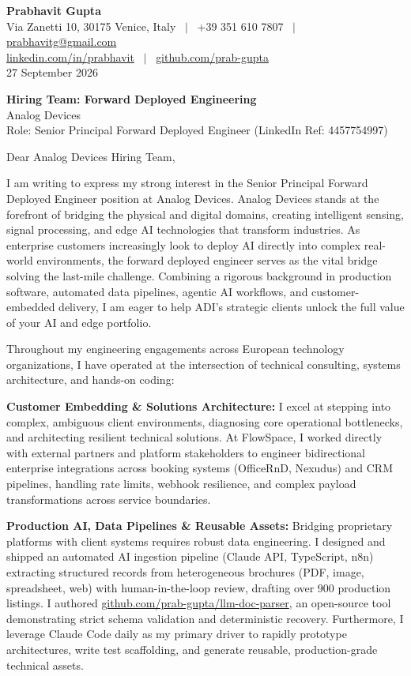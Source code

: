 \documentclass[10.5pt,a4paper]{article}
\begin{document}
\textbf{\large Prabhavit Gupta}\\
Via Zanetti 10, 30175 Venice, Italy ~$\vert$~ +39 351 610 7807 ~$\vert$~ \href{mailto:prabhavitg@gmail.com}{prabhavitg@gmail.com}\\
\href{https://www.linkedin.com/in/prabhavit/}{linkedin.com/in/prabhavit} ~$\vert$~ \href{https://github.com/prab-gupta}{github.com/prab-gupta}\\
27 September 2026

\textbf{Hiring Team: Forward Deployed Engineering}\\
Analog Devices\\
Role: Senior Principal Forward Deployed Engineer (LinkedIn Ref: 4457754997)

Dear Analog Devices Hiring Team,

I am writing to express my strong interest in the Senior Principal Forward Deployed Engineer position at Analog Devices. Analog Devices stands at the forefront of bridging the physical and digital domains, creating intelligent sensing, signal processing, and edge AI technologies that transform industries. As enterprise customers increasingly look to deploy AI directly into complex real-world environments, the forward deployed engineer serves as the vital bridge solving the last-mile challenge. Combining a rigorous background in production software, automated data pipelines, agentic AI workflows, and customer-embedded delivery, I am eager to help ADI's strategic clients unlock the full value of your AI and edge portfolio.

Throughout my engineering engagements across European technology organizations, I have operated at the intersection of technical consulting, systems architecture, and hands-on coding:

\textbf{Customer Embedding \& Solutions Architecture:} I excel at stepping into complex, ambiguous client environments, diagnosing core operational bottlenecks, and architecting resilient technical solutions. At FlowSpace, I worked directly with external partners and platform stakeholders to engineer bidirectional enterprise integrations across booking systems (OfficeRnD, Nexudus) and CRM pipelines, handling rate limits, webhook resilience, and complex payload transformations across service boundaries.

\textbf{Production AI, Data Pipelines \& Reusable Assets:} Bridging proprietary platforms with client systems requires robust data engineering. I designed and shipped an automated AI ingestion pipeline (Claude API, TypeScript, n8n) extracting structured records from heterogeneous brochures (PDF, image, spreadsheet, web) with human-in-the-loop review, drafting over 900 production listings. I authored \href{https://github.com/prab-gupta/llm-doc-parser}{github.com/prab-gupta/llm-doc-parser}, an open-source tool demonstrating strict schema validation and deterministic recovery. Furthermore, I leverage Claude Code daily as my primary driver to rapidly prototype architectures, write test scaffolding, and generate reusable, production-grade technical assets.
\end{document}
